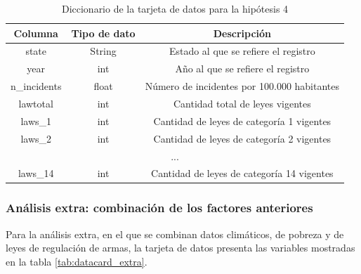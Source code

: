 \documentclass[11pt,a4paper]{article}
\begin{document}
\begin{table}[H]
    \centering
\begin{tabular}{|ccc|}
\hline
\multicolumn{1}{|c|}{\textbf{Columna}} & \multicolumn{1}{c|}{\textbf{Tipo de dato}} & \textbf{Descripción}                        \\ \hline
\multicolumn{1}{|c|}{state}            & \multicolumn{1}{c|}{String}                & Estado al que se refiere el registro        \\ \hline
\multicolumn{1}{|c|}{year}             & \multicolumn{1}{c|}{int}                   & Año al que se refiere el registro           \\ \hline
\multicolumn{1}{|c|}{n\_incidents}     & \multicolumn{1}{c|}{float}                 & Número de incidentes por 100.000 habitantes \\ \hline
\multicolumn{1}{|c|}{lawtotal}         & \multicolumn{1}{c|}{int}                   & Cantidad total de leyes vigentes            \\ \hline
\multicolumn{1}{|c|}{laws\_1}          & \multicolumn{1}{c|}{int}                   & Cantidad de leyes de categoría 1 vigentes   \\ \hline
\multicolumn{1}{|c|}{laws\_2}          & \multicolumn{1}{c|}{int}                   & Cantidad de leyes de categoría 2 vigentes   \\ \hline
\multicolumn{3}{|c|}{...}                                                                                                         \\ \hline
\multicolumn{1}{|c|}{laws\_14}         & \multicolumn{1}{c|}{int}                   & Cantidad de leyes de categoría 14 vigentes  \\ \hline
\end{tabular}
    \caption{Diccionario de la tarjeta de datos para la hipótesis 4}
    \label{tab:datacard_h4}
\end{table}
\subsubsection*{Análisis extra: combinación de los factores anteriores}

Para la análisis extra, en el que se combinan datos climáticos, de pobreza y de leyes de regulación de armas, la tarjeta de datos presenta las variables mostradas en la tabla \ref{tab:datacard_extra}.
\end{document}
